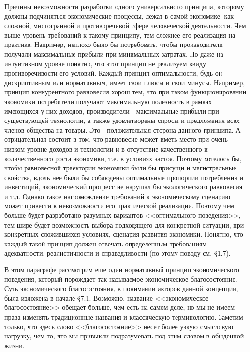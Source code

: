 \documentclass[12pt, 4paper]{book}
\begin{document}
{Причины невозможности разработки одного универсального принципа, которому должны подчиняться экономические процессы, лежат в самой экономике, как сложной, многогранной и противоречивой сфере человеческой деятельности. Чем выше уровень требований к такому принципу, тем сложнее его реализация на практике. Например, неплохо было бы потребовать, чтобы производители получали максимальные прибыли при минимальных затратах. Но даже на интуитивном уровне понятно, что этот принцип не реализуем ввиду противоречивости его условий. Каждый принцип оптимальности, будь он дискриптивным или нормативным, имеет свои плюсы и свои минусы. Например, принцип конкурентного равновесия хорош тем, что при таком функционировании экономики потребители получают максимальную полезность в рамках имеющихся у них доходов, производители - максимальные прибыли при существующей технологии, а также удовлетворены спросы и предложения всех членов общества на товары. Это - положительная сторона данного принципа. А отрицательная состоит в том, что равновесие может иметь место при очень низком уровне доходов и технологии и в отсутствие качественного и количественного роста экономики, т.е. в условиях застоя. Поэтому хотелось бы, чтобы равновесной траектории экономики были бы присущи и магистральные свойства, вдоль нее были бы соблюдены оптимальные пропорции потребления и инвестиций, экономический прогресс не нарушал бы экологического равновесия и т.д. Однако такое нагромождение требований к экономическому сценарию может привести к невозможности его практической реализации. Поэтому чем больше будет разработано разумных вариантов <<оптимального поведения>>, тем шире будет возможность выбора подходящего для конкретной ситуации, при конкретных сложившихся условиях, сценария развития экономики. Понятно, что каждый такой принцип должен отвечать определенным требованиям адекватности, реалистичности и справедливости (по этому поводу см. §1.7).
\par

В этом параграфе рассмотрим еще один нормативный принцип экономического поведения, который порождает так называемое экономическое благосостояние. Суть экономического благосостояния, в понимании авторов данной концепции, была изложена в начале §7.1. Возможно, название <<экономическое благосостояние>> обещает больше, чем есть на самом деле, но мы не имеем права изменять традиционные названия и классическую терминологию. Заметим только, что здесь слово <<благосостояние>> несет более узкую смысловую нагрузку, чем то, что мы привыкли подразумевать под этим словом в обыденной жизни.
\par

}
\end{document}

